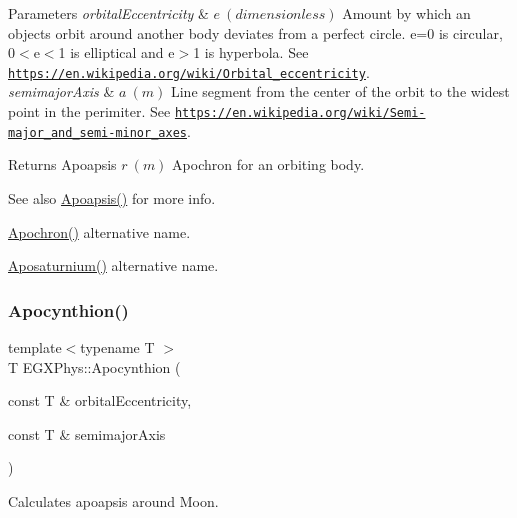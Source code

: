 \begin{DoxyParams}{Parameters}
{\em orbital\+Eccentricity} & $ e\ (dimensionless)$ Amount by which an objects orbit around another body deviates from a perfect circle. e=0 is circular, 0$<$e$<$1 is elliptical and e$>$1 is hyperbola. See \href{https://en.wikipedia.org/wiki/Orbital_eccentricity}{\tt https\+://en.\+wikipedia.\+org/wiki/\+Orbital\+\_\+eccentricity}. \\
\hline
{\em semimajor\+Axis} & $ a\ (m)$ Line segment from the center of the orbit to the widest point in the perimiter. See \href{https://en.wikipedia.org/wiki/Semi-major_and_semi-minor_axes}{\tt https\+://en.\+wikipedia.\+org/wiki/\+Semi-\/major\+\_\+and\+\_\+semi-\/minor\+\_\+axes}. \\
\hline
\end{DoxyParams}
\begin{DoxyReturn}{Returns}
Apoapsis $ r\ (m)$ Apochron for an orbiting body. 
\end{DoxyReturn}
\begin{DoxySeeAlso}{See also}
\mbox{\hyperlink{group___e_g_x_phys-_apoapsis_gaf962e650bf84a568458e8eb39b1c61ba}{Apoapsis()}} for more info. 

\mbox{\hyperlink{group___e_g_x_phys-_apoapsis_gae4ea146039e6f32022321f0998e715e8}{Apochron()}} alternative name. 

\mbox{\hyperlink{group___e_g_x_phys-_apoapsis_gac157adc20a88c8616e4822eb819f9016}{Aposaturnium()}} alternative name. 
\end{DoxySeeAlso}
\mbox{\label{group___e_g_x_phys-_apoapsis_ga557bb4d1a0ce7f17aaa8f8de469d4f52}} 
\subsubsection{\texorpdfstring{Apocynthion()}{Apocynthion()}}
{\footnotesize\ttfamily template$<$typename T $>$ \\
T E\+G\+X\+Phys\+::\+Apocynthion (\begin{DoxyParamCaption}\item[{const T \&}]{orbital\+Eccentricity,  }\item[{const T \&}]{semimajor\+Axis }\end{DoxyParamCaption})}



Calculates apoapsis around Moon. 



